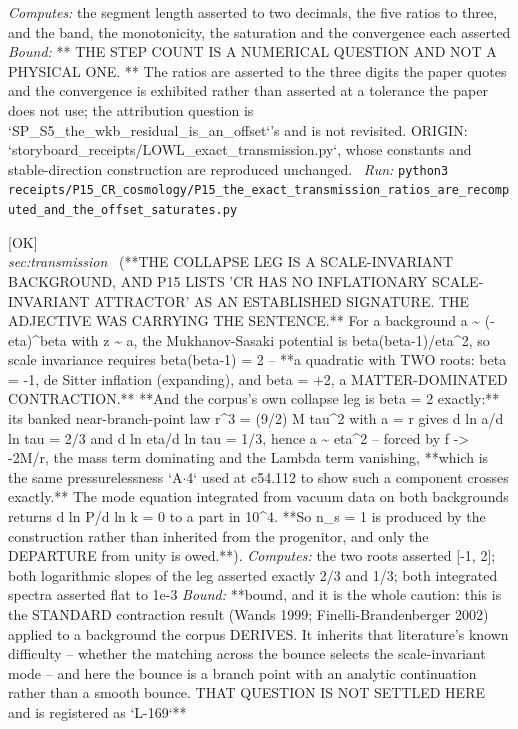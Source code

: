 \begin{description}
\emph{Computes:} the segment length asserted to two decimals, the five ratios to three, and the band, the monotonicity, the saturation and the convergence each asserted
 \emph{Bound:} ** THE STEP COUNT IS A NUMERICAL QUESTION AND NOT A PHYSICAL ONE. ** The ratios are asserted to the three digits the paper quotes and the convergence is exhibited rather than asserted at a tolerance the paper does not use; the attribution question is `SP\_S5\_the\_wkb\_residual\_is\_an\_offset`'s and is not revisited. ORIGIN: `storyboard\_receipts/LOWL\_exact\_transmission.py`, whose constants and stable-direction construction are reproduced unchanged.
\ \emph{Run:} \texttt{python3 receipts/P15\_CR\_cosmology/P15\_the\_exact\_transmission\_ratios\_are\_recomputed\_and\_the\_offset\_saturates.py}
\item[\rcptlabel{P15_the_collapse_leg_is_scale_invariant}{P15R82}\textbf{P15R82}\quad\texttt{P15\_the\_collapse\_leg\_is\_scale\_invariant}]\hfill\textsf{[OK]}\\
\textit{sec:transmission} \ (**THE COLLAPSE LEG IS A SCALE-INVARIANT BACKGROUND, AND P15 LISTS 'CR HAS NO INFLATIONARY SCALE-INVARIANT ATTRACTOR' AS AN ESTABLISHED SIGNATURE. THE ADJECTIVE WAS CARRYING THE SENTENCE.** For a background a \textasciitilde{} (-eta)\textasciicircum{}beta with z \textasciitilde{} a, the Mukhanov-Sasaki potential is beta(beta-1)/eta\textasciicircum{}2, so scale invariance requires beta(beta-1) = 2 -- **a quadratic with TWO roots: beta = -1, de Sitter inflation (expanding), and beta = +2, a MATTER-DOMINATED CONTRACTION.** **And the corpus's own collapse leg is beta = 2 exactly:** its banked near-branch-point law r\textasciicircum{}3 = (9/2) M tau\textasciicircum{}2 with a = \textbar{}r\textbar{} gives d ln a/d ln tau = 2/3 and d ln eta/d ln tau = 1/3, hence a \textasciitilde{} eta\textasciicircum{}2 -- forced by f -> -2M/r, the mass term dominating and the Lambda term vanishing, **which is the same pressurelessness `A\ensuremath{\cdot}4` used at c54.112 to show such a component crosses exactly.** The mode equation integrated from vacuum data on both backgrounds returns d ln P/d ln k = 0 to a part in 10\textasciicircum{}4. **So n\_s = 1 is produced by the construction rather than inherited from the progenitor, and only the DEPARTURE from unity is owed.**). 
\emph{Computes:} the two roots asserted [-1, 2]; both logarithmic slopes of the leg asserted exactly 2/3 and 1/3; both integrated spectra asserted flat to 1e-3
 \emph{Bound:} **bound, and it is the whole caution: this is the STANDARD contraction result (Wands 1999; Finelli-Brandenberger 2002) applied to a background the corpus DERIVES. It inherits that literature's known difficulty -- whether the matching across the bounce selects the scale-invariant mode -- and here the bounce is a branch point with an analytic continuation rather than a smooth bounce. THAT QUESTION IS NOT SETTLED HERE and is registered as `L-169`**

\end{description}
